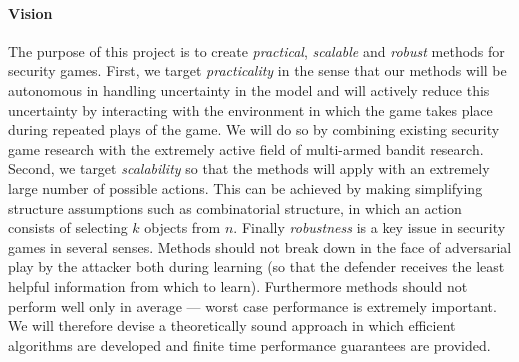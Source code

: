 
\paragraph{Vision}
The purpose of this project is to create \textit{practical}, \textit{scalable} and \textit{robust} methods for security games. First, we target \textit{practicality}  in the sense that our methods will be autonomous in handling uncertainty in the model and will actively reduce this uncertainty by interacting with the environment in which the game takes place during repeated plays of the game. We will do so by combining existing security game research with the extremely active field of multi-armed bandit research.
Second, we target \textit{scalability} so that the methods will apply with an extremely large number of possible actions. This can be achieved by making simplifying structure assumptions such as combinatorial structure, in which an action consists of selecting $k$ objects from $n$. %
Finally \textit{robustness}  is a key issue in security games in several senses.  Methods should not break down in the face of adversarial play by the attacker both during learning (so that the defender receives the least helpful information from which to learn).  Furthermore methods should not perform well only in average --- worst case performance is extremely important.  We will therefore devise a theoretically sound approach in which efficient algorithms are developed and finite time performance guarantees are provided.

